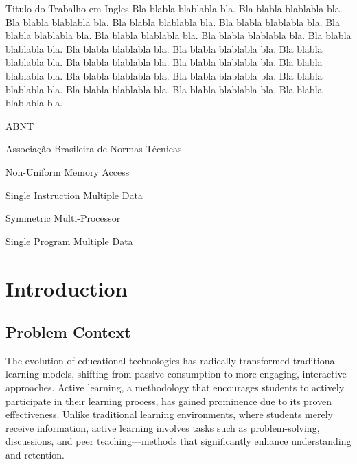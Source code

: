 \documentclass[tcc,capa]{texufpel}
\begin{document}
\begin{englishabstract}{Titulo do Trabalho em Ingles}
Bla blabla blablabla bla.  Bla blabla blablabla bla.  Bla blabla
blablabla bla.  Bla blabla blablabla bla.  Bla blabla blablabla bla.
Bla blabla blablabla bla.  Bla blabla blablabla bla.  Bla blabla
blablabla bla.  Bla blabla blablabla bla.  Bla blabla blablabla bla.
Bla blabla blablabla bla.  Bla blabla blablabla bla.  Bla blabla
blablabla bla.  Bla blabla blablabla bla.  Bla blabla blablabla bla.
Bla blabla blablabla bla.  Bla blabla blablabla bla.  Bla blabla
blablabla bla.  Bla blabla blablabla bla.  Bla blabla blablabla bla.
Bla blabla blablabla bla.
\end{englishabstract}

\listoffigures

\listoftables

\begin{listofabbrv}{ABNT}%
        \item[ABNT] Associação Brasileira de Normas Técnicas
        \item[NUMA] Non-Uniform Memory Access
        \item[SIMD] Single Instruction Multiple Data
        \item[SMP] Symmetric Multi-Processor
        \item[SPMD] Single Program Multiple Data
\end{listofabbrv}

\tableofcontents

\chapter{Introduction}
\section{Problem Context}
The evolution of educational technologies has radically transformed traditional learning models, shifting from passive consumption to more engaging, interactive approaches. Active learning, a methodology that encourages students to actively participate in their learning process, has gained prominence due to its proven effectiveness. Unlike traditional learning environments, where students merely receive information, active learning involves tasks such as problem-solving, discussions, and peer teaching—methods that significantly enhance understanding and retention.
\end{document}
